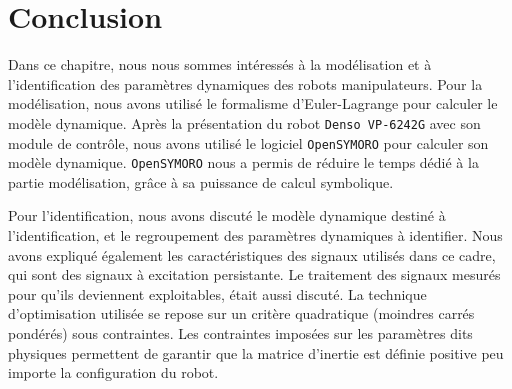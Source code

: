 \documentclass[12pt,a4paper,twoside]{report}
\begin{document}
\chapter*{Conclusion}

Dans ce chapitre, nous nous sommes intéressés à la modélisation et à l'identification des paramètres dynamiques des robots manipulateurs. Pour la modélisation, nous avons utilisé le formalisme d'Euler-Lagrange pour calculer le modèle dynamique. Après la présentation du robot \verb"Denso VP-6242G" avec son module de contrôle, nous avons utilisé le logiciel \verb"OpenSYMORO" pour calculer son modèle dynamique. \verb"OpenSYMORO" nous a permis de réduire le temps dédié à la partie modélisation, grâce à sa puissance de calcul symbolique.

Pour l'identification, nous avons discuté le modèle dynamique destiné à l'identification, et le regroupement des paramètres dynamiques à identifier. Nous avons expliqué également les caractéristiques des signaux utilisés dans ce cadre, qui sont des signaux à excitation persistante. Le traitement des signaux mesurés pour qu'ils deviennent exploitables, était aussi discuté.
La technique d'optimisation utilisée se repose sur un critère quadratique (moindres carrés pondérés) sous contraintes.
Les contraintes imposées sur les paramètres dits physiques permettent de garantir que la matrice d'inertie est définie positive peu importe la configuration du robot.
\end{document}
